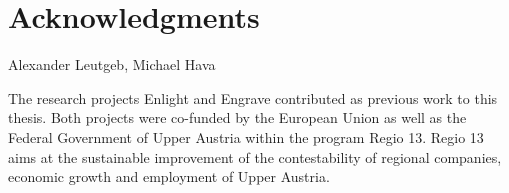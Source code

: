 \chapter*{Acknowledgments}

Alexander Leutgeb, Michael Hava


The research projects Enlight and Engrave contributed as previous work to this thesis.
Both projects were co-funded by the European Union as well as the Federal Government of Upper Austria within the program Regio 13.
Regio 13 aims at the sustainable improvement of the contestability of regional companies, economic growth and employment of Upper Austria.
